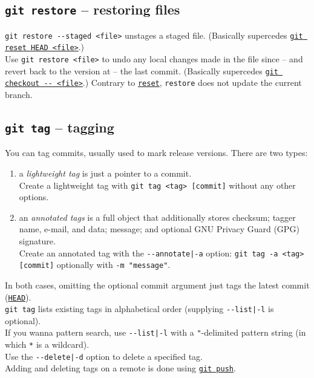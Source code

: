 \documentclass[8pt, table, xcdraw]{article}%
\begin{document}
\subsection{\lstinline{git restore} -- restoring files} \label{restore}

\lstinline{git restore --staged <file>} unstages a staged file. (Basically supercedes \hyperref[reset]{\lstinline{git reset HEAD <file>}}.)\\
Use \lstinline{git restore <file>} to undo any local changes made in the file since -- and revert back to the version at -- the last commit. (Basically supercedes \hyperref[checkout]{\lstinline{git checkout -- <file>}}.)
Contrary to \hyperref[reset]{\lstinline{reset}}, \lstinline{restore} does not update the current branch.

\subsection{\lstinline{git tag} -- tagging} \label{tag}

You can tag commits, usually used to mark release versions. There are two types:

\begin{enumerate}
    \item a \emph{lightweight tag} is just a pointer to a commit.\\
    Create a lightweight tag with \lstinline{git tag <tag> [commit]} without any other options.
    \item an \emph{annotated tags} is a full object that additionally stores checksum; tagger name, e-mail, and data; message; and optional GNU Privacy Guard (GPG) signature.\\
    Create an annotated tag with the \lstinline{--annotate|-a} option: \lstinline{git tag -a <tag> [commit]} optionally with \lstinline{-m "message"}.
\end{enumerate}

In both cases, omitting the optional commit argument just tags the latest commit (\hyperref[branching]{\lstinline{HEAD}}).\\
\lstinline{git tag} lists existing tags in alphabetical order (supplying \lstinline{--list|-l} is optional).\\
If you wanna pattern search, use \lstinline{--list|-l} with a \lstinline{"}-delimited pattern string (in which \lstinline{*} is a wildcard).\\
Use the \lstinline{--delete|-d} option to delete a specified tag.\\
Adding and deleting tags on a remote is done using \hyperref[push]{\lstinline{git push}}.
\end{document}
